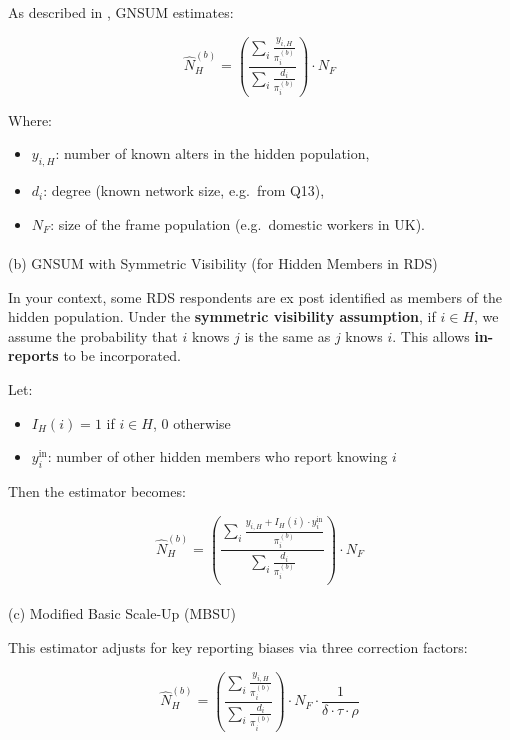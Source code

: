 \documentclass[
  12pt,
  letterpaper,
  DIV=11,
  numbers=noendperiod]{scrartcl}
\makeatletter
\let\oldparagraph\paragraph
\renewcommand{\paragraph}{
    \@ifstar
      \xxxParagraphStar
      \xxxParagraphNoStar
  }
\newcommand{\xxxParagraphStar}[1]{\oldparagraph*{#1}\mbox{}}
\newcommand{\xxxParagraphNoStar}[1]{\oldparagraph{#1}\mbox{}}
\theoremstyle{plain}
\theoremstyle{definition}
\makeatother
\begin{document}
As described in \textcite{feeh16-generaling}, GNSUM estimates:

\[\hat{N}_H^{(b)} = \left( \frac{\sum_{i} \frac{y_{i,H}}{\pi_i^{(b)}}}{\sum_{i} \frac{d_i}{\pi_i^{(b)}}} \right) \cdot N_F\]

Where:

\begin{itemize}
\item
  \(y_{i,H}\): number of known alters in the hidden population,
\item
  \(d_i\): degree (known network size, e.g.~from Q13),
\item
  \(N_F\): size of the frame population (e.g.~domestic workers in UK).
\end{itemize}

\paragraph{(b) GNSUM with Symmetric Visibility (for Hidden Members in
RDS)}\label{b-gnsum-with-symmetric-visibility-for-hidden-members-in-rds}

In your context, some RDS respondents are ex post identified as members
of the hidden population. Under the \textbf{symmetric visibility
assumption}, if \(i \in H\), we assume the probability that \(i\) knows
\(j\) is the same as \(j\) knows \(i\). This allows \textbf{in-reports}
to be incorporated.

Let:

\begin{itemize}
\item
  \(I_H(i) = 1\) if \(i \in H\), 0 otherwise
\item
  \(y_{i}^{\text{in}}\): number of other hidden members who report
  knowing \(i\)
\end{itemize}

Then the estimator becomes:

\[\hat{N}_H^{(b)} = \left( \frac{\sum_{i} \frac{y_{i,H} + I_H(i) \cdot y_{i}^{\text{in}}}{\pi_i^{(b)}}}{\sum_{i} \frac{d_i}{\pi_i^{(b)}}} \right) \cdot N_F\]

\paragraph{(c) Modified Basic Scale-Up
(MBSU)}\label{c-modified-basic-scale-up-mbsu}

This estimator adjusts for key reporting biases via three correction
factors:

\[\hat{N}_H^{(b)} = \left( \frac{\sum_{i} \frac{y_{i,H}}{\pi_i^{(b)}}}{\sum_{i} \frac{d_i}{\pi_i^{(b)}}} \right) \cdot N_F \cdot \frac{1}{\delta \cdot \tau \cdot \rho}\]
\end{document}
